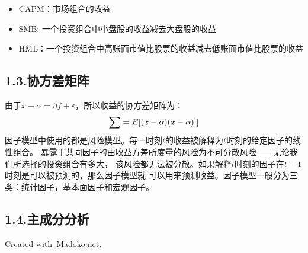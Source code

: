 \documentclass{article}
\begin{document}
\begin{itemize}[noitemsep,topsep=\mdcompacttopsep]%

\item{}CAPM：市场组合的收益%

\item{}SMB: 一个投资组合中小盘股的收益减去大盘股的收益%

\item{}HML：一个投资组合中高账面市值比股票的收益减去低账面市值比股票的收益%
\end{itemize}%

\subsection{1.3.\hspace*{0.5em}协方差矩阵}\label{section}%

\noindent{}由于$x-\alpha=\beta f+\varepsilon$，所以收益的协方差矩阵为：%
\label{}%
\noindent{}
\noindent\[%
\sum=E[(x-\alpha)(x-\alpha)^`]
\]%
\noindent{}因子模型中使用的都是风险模型。每一时刻$t$的收益被解释为$t$时刻的给定因子的线性组合。
暴露于共同因子的由收益方差所度量的风险为不可分散风险——无论我们所选择的投资组合有多大，
该风险都无法被分散。如果解释$t$时刻的因子在$t-1$时刻是可以被预测的，那么因子模型就
可以用来预测收益。因子模型一般分为三类：统计因子，基本面因子和宏观因子。

\subsection{1.4.\hspace*{0.5em}主成分分析}\label{section}%

\begin{mdbmargintb}{4em}{}%
\begin{mdflushright}%
{\tiny{}Created with~\href{https://www.madoko.net}{Madoko.net}.}%
\end{mdflushright}%
\end{mdbmargintb}%
\end{document}
